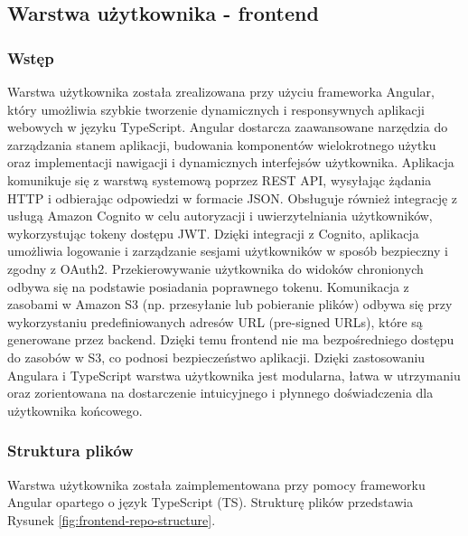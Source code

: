 \documentclass[../../main.tex]{subfiles}
\begin{document}
    \subsection{Warstwa użytkownika - frontend}

    \subsubsection{Wstęp}
    Warstwa użytkownika została zrealizowana przy użyciu frameworka Angular, który umożliwia szybkie tworzenie dynamicznych i responsywnych aplikacji webowych w języku TypeScript. Angular dostarcza zaawansowane narzędzia do zarządzania stanem aplikacji, budowania komponentów wielokrotnego użytku oraz implementacji nawigacji i dynamicznych interfejsów użytkownika.
    Aplikacja komunikuje się z warstwą systemową poprzez REST API, wysyłając żądania HTTP i odbierając odpowiedzi w formacie JSON. Obsługuje również integrację z usługą Amazon Cognito w celu autoryzacji i uwierzytelniania użytkowników, wykorzystując tokeny dostępu JWT.
    Dzięki integracji z Cognito, aplikacja umożliwia logowanie i zarządzanie sesjami użytkowników w sposób bezpieczny i zgodny z OAuth2. Przekierowywanie użytkownika do widoków chronionych odbywa się na podstawie posiadania poprawnego tokenu.
    Komunikacja z zasobami w Amazon S3 (np. przesyłanie lub pobieranie plików) odbywa się przy wykorzystaniu predefiniowanych adresów URL (pre-signed URLs), które są generowane przez backend. Dzięki temu frontend nie ma bezpośredniego dostępu do zasobów w S3, co podnosi bezpieczeństwo aplikacji.
    Dzięki zastosowaniu Angulara i TypeScript warstwa użytkownika jest modularna, łatwa w utrzymaniu oraz zorientowana na dostarczenie intuicyjnego i płynnego doświadczenia dla użytkownika końcowego.

    \subsubsection{Struktura plików}
    Warstwa użytkownika została zaimplementowana przy pomocy frameworku Angular\cite{angular} opartego o język TypeScript (TS). Strukturę plików przedstawia Rysunek \ref{fig:frontend-repo-structure}.
\end{document}
